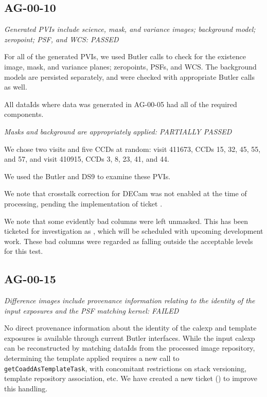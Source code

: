\documentclass[DM,STR,toc]{lsstdoc}
\begin{document}
\subsection{AG-00-10}
\label{sect:ag-00-10}

\textit{Generated PVIs include science, mask, and variance images; background model; zeropoint; PSF, and WCS: PASSED}

For all of the generated PVIs, we used Butler calls to check for the existence
image, mask, and variance planes; zeropoints, PSFs, and WCS. The background models are persisted separately, and were checked with appropriate Butler calls as well.

All dataIds where data was generated in AG-00-05 had all of the required components.

\textit{Masks and background are appropriately applied: PARTIALLY PASSED}

We chose two visits and five CCDs at random:
visit 411673, CCDs 15, 32, 45, 55, and 57, and
visit 410915, CCDs 3,  8, 23, 41, and 44.

We used the Butler and DS9 to examine these PVIs.

We note that crosstalk correction for DECam was not enabled at the time of
processing, pending the implementation of ticket .

We note that some evidently bad columns were left unmasked. This has been
ticketed for investigation as , which will be scheduled with
upcoming development work. These bad columns were regarded as falling outside
the acceptable levels for this test.

\subsection{AG-00-15}
\label{sect:ag-00-15}

\textit{Difference images include provenance information relating to the
identity of the input exposures and the PSF matching kernel:  FAILED}

No direct provenance information about the identity of the calexp and template
exposures is available through current Butler interfaces.  While the input
calexp can be reconstructed by matching dataIds from the processed image
repository, determining the template applied requires a new call to
\texttt{getCoaddAsTemplateTask}, with concomitant restrictions on
stack versioning, template repository association, etc.
We have created a new ticket () to improve this handling.
\end{document}
